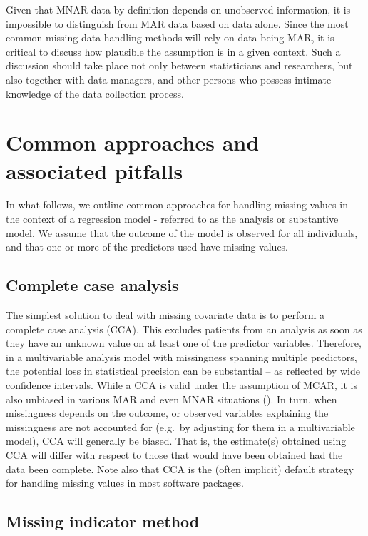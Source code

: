 \documentclass[
  letterpaper,
  paper=240mm:170mm,
  twoside=true,
  open=right,
  fontsize=10pt,
  pagesize=false,
  BCOR=15mm,
  DIV=14,
  headinclude=true,
  footinclude=false,
  headsepline=on]{scrbook}
\begin{document}
Given that MNAR data by definition depends on unobserved information, it
is impossible to distinguish from MAR data based on data alone. Since
the most common missing data handling methods will rely on data being
MAR, it is critical to discuss how plausible the assumption is in a
given context. Such a discussion should take place not only between
statisticians and researchers, but also together with data managers, and
other persons who possess intimate knowledge of the data collection
process.

\section{Common approaches and associated
pitfalls}\label{common-approaches-and-associated-pitfalls}

In what follows, we outline common approaches for handling missing
values in the context of a regression model - referred to as the
analysis or substantive model. We assume that the outcome of the model
is observed for all individuals, and that one or more of the predictors
used have missing values.

\subsection{Complete case analysis}\label{complete-case-analysis}

The simplest solution to deal with missing covariate data is to perform
a complete case analysis (CCA). This excludes patients from an analysis
as soon as they have an unknown value on at least one of the predictor
variables. Therefore, in a multivariable analysis model with missingness
spanning multiple predictors, the potential loss in statistical
precision can be substantial -- as reflected by wide confidence
intervals. While a CCA is valid under the assumption of MCAR, it is also
unbiased in various MAR and even MNAR situations
(). In turn, when missingness depends on the outcome, or observed
variables explaining the missingness are not accounted for (e.g.~by
adjusting for them in a multivariable model), CCA will generally be
biased. That is, the estimate(s) obtained using CCA will differ with
respect to those that would have been obtained had the data been
complete. Note also that CCA is the (often implicit) default strategy
for handling missing values in most software packages.

\subsection{Missing indicator method}\label{missing-indicator-method}
\end{document}
